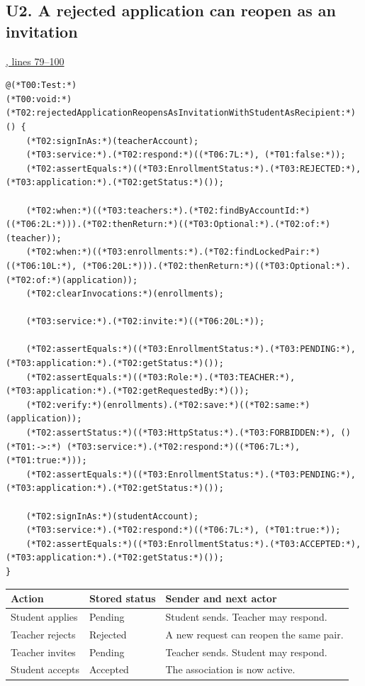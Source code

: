 \subsection{U2. A rejected application can reopen as an invitation}
\par\smallskip
{\small\href{\repo/blob/5d22aed7f6d4ef1e4c0b0c0dabf2962ba4b47608/src/test/java/com/example/fmschool/EnrollmentServiceUnitTests.java#L79-L100}{, lines 79--100}}
\begin{lstlisting}[style=vsJava,firstnumber=79]
@(*T00:Test:*)
(*T00:void:*) (*T02:rejectedApplicationReopensAsInvitationWithStudentAsRecipient:*)() {
    (*T02:signInAs:*)(teacherAccount);
    (*T03:service:*).(*T02:respond:*)((*T06:7L:*), (*T01:false:*));
    (*T02:assertEquals:*)((*T03:EnrollmentStatus:*).(*T03:REJECTED:*), (*T03:application:*).(*T02:getStatus:*)());

    (*T02:when:*)((*T03:teachers:*).(*T02:findByAccountId:*)((*T06:2L:*))).(*T02:thenReturn:*)((*T03:Optional:*).(*T02:of:*)(teacher));
    (*T02:when:*)((*T03:enrollments:*).(*T02:findLockedPair:*)((*T06:10L:*), (*T06:20L:*))).(*T02:thenReturn:*)((*T03:Optional:*).(*T02:of:*)(application));
    (*T02:clearInvocations:*)(enrollments);

    (*T03:service:*).(*T02:invite:*)((*T06:20L:*));

    (*T02:assertEquals:*)((*T03:EnrollmentStatus:*).(*T03:PENDING:*), (*T03:application:*).(*T02:getStatus:*)());
    (*T02:assertEquals:*)((*T03:Role:*).(*T03:TEACHER:*), (*T03:application:*).(*T02:getRequestedBy:*)());
    (*T02:verify:*)(enrollments).(*T02:save:*)((*T02:same:*)(application));
    (*T02:assertStatus:*)((*T03:HttpStatus:*).(*T03:FORBIDDEN:*), () (*T01:->:*) (*T03:service:*).(*T02:respond:*)((*T06:7L:*), (*T01:true:*)));
    (*T02:assertEquals:*)((*T03:EnrollmentStatus:*).(*T03:PENDING:*), (*T03:application:*).(*T02:getStatus:*)());

    (*T02:signInAs:*)(studentAccount);
    (*T03:service:*).(*T02:respond:*)((*T06:7L:*), (*T01:true:*));
    (*T02:assertEquals:*)((*T03:EnrollmentStatus:*).(*T03:ACCEPTED:*), (*T03:application:*).(*T02:getStatus:*)());
}
\end{lstlisting}


\begin{tabularx}{\linewidth}{@{}p{.23\linewidth}p{.22\linewidth}Y@{}}
\toprule
Action & Stored status & Sender and next actor \\
\midrule
Student applies & Pending & Student sends. Teacher may respond. \\
Teacher rejects & Rejected & A new request can reopen the same pair. \\
Teacher invites & Pending & Teacher sends. Student may respond. \\
Student accepts & Accepted & The association is now active. \\
\bottomrule
\end{tabularx}

